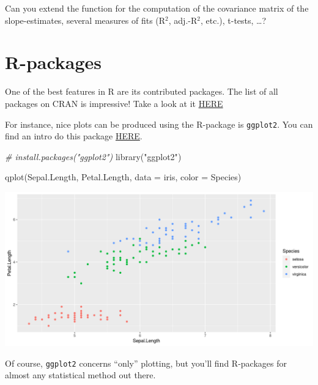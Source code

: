 \documentclass[
  14pt,
]{memoir}
\newenvironment{Shaded}{\begin{snugshade}}{\end{snugshade}}
\newcommand{\AttributeTok}[1]{\textcolor[rgb]{0.77,0.63,0.00}{#1}}
\newcommand{\CommentTok}[1]{\textcolor[rgb]{0.56,0.35,0.01}{\textit{#1}}}
\newcommand{\FunctionTok}[1]{\textcolor[rgb]{0.00,0.00,0.00}{#1}}
\newcommand{\NormalTok}[1]{#1}
\newcommand{\StringTok}[1]{\textcolor[rgb]{0.31,0.60,0.02}{#1}}
\begin{document}
\hfill\break

Can you extend the function for the computation of the covariance matrix of the slope-estimates, several measures of fits (R\(^2\), adj.-R\(^2\), etc.), t-tests, \ldots?

\hypertarget{r-packages}{%
\section{R-packages}\label{r-packages}}

One of the best features in R are its contributed packages. The list of all packages on CRAN is impressive! Take a look at it \href{https://cran.r-project.org/web/packages/available_packages_by_name.html}{HERE}

For instance, nice plots can be produced using the R-package is \texttt{ggplot2}. You can find an intro do this package \href{http://ggplot2.tidyverse.org/}{HERE}.

\begin{Shaded}
\begin{Highlighting}[]
\CommentTok{\# install.packages("ggplot2")}
\FunctionTok{library}\NormalTok{(}\StringTok{"ggplot2"}\NormalTok{)}

\FunctionTok{qplot}\NormalTok{(Sepal.Length, Petal.Length, }\AttributeTok{data =}\NormalTok{ iris, }\AttributeTok{color =}\NormalTok{ Species)}
\end{Highlighting}
\end{Shaded}

\begin{center}\includegraphics[width=\textwidth]{figure/minimal-unnamed-chunk-34-1} \end{center}

\hfill\break

Of course, \texttt{ggplot2} concerns ``only'' plotting, but you'll find R-packages for almost any statistical method out there.
\end{document}
